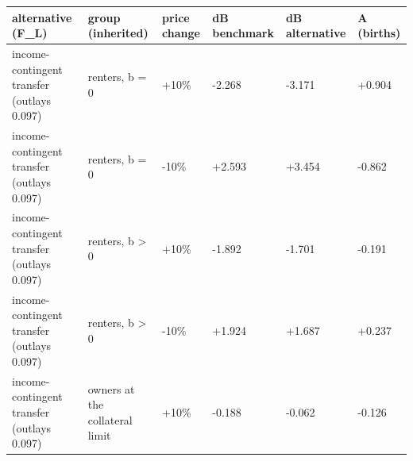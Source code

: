 \begingroup\small
\setlength{\tabcolsep}{3pt}
\renewcommand{\arraystretch}{1.04}
\begin{tabularx}{\linewidth}{XXXXXX}
\toprule
alternative (F\_L) & group (inherited) & price change & dB benchmark & dB alternative & A (births) \\
\midrule
income-contingent transfer (outlays 0.097) & renters, b = 0 & +10\% & -2.268 & -3.171 & +0.904 \\
income-contingent transfer (outlays 0.097) & renters, b = 0 & -10\% & +2.593 & +3.454 & -0.862 \\
income-contingent transfer (outlays 0.097) & renters, b \textgreater{} 0 & +10\% & -1.892 & -1.701 & -0.191 \\
income-contingent transfer (outlays 0.097) & renters, b \textgreater{} 0 & -10\% & +1.924 & +1.687 & +0.237 \\
income-contingent transfer (outlays 0.097) & owners at the collateral limit & +10\% & -0.188 & -0.062 & -0.126 \\
\bottomrule
\end{tabularx}
\endgroup
